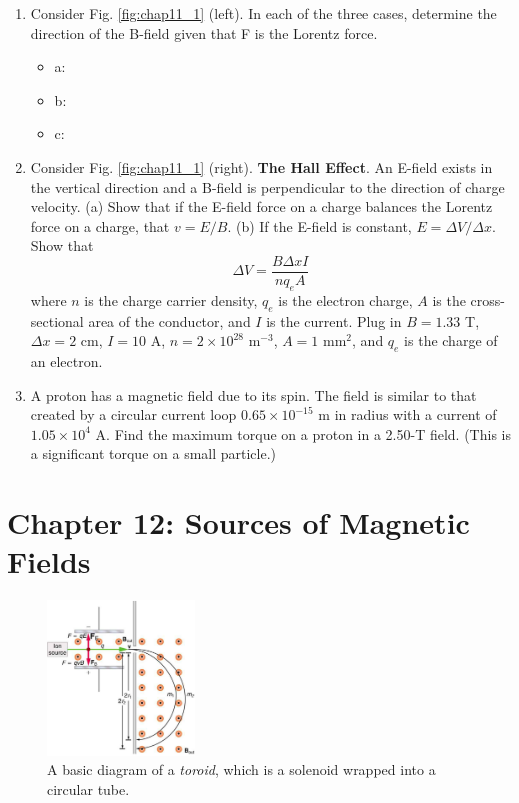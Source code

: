 \documentclass[10pt]{article}
\begin{document}
\begin{enumerate}
\item Consider Fig. \ref{fig:chap11_1} (left).  In each of the three cases, determine the direction of the B-field given that F is the Lorentz force.
\begin{itemize}
\item a:
\item b:
\item c:
\end{itemize}
\item Consider Fig. \ref{fig:chap11_1} (right).  \textbf{The Hall Effect}.  An E-field exists in the vertical direction and a B-field is perpendicular to the direction of charge velocity.  (a) Show that if the E-field force on a charge balances the Lorentz force on a charge, that $v = E/B$. (b) If the E-field is constant, $E = \Delta V/\Delta x$.  Show that
\begin{equation}
\Delta V = \frac{B\Delta x I}{n q_e A}
\end{equation}
where $n$ is the charge carrier density, $q_e$ is the electron charge, $A$ is the cross-sectional area of the conductor, and $I$ is the current.  Plug in $B = 1.33$ T, $\Delta x = 2$ cm, $I = 10$ A, $n = 2 \times 10^{28}$ m$^{-3}$, $A = 1$ mm$^2$, and $q_e$ is the charge of an electron. \\ \vspace{2.5cm}
\item A proton has a magnetic field due to its spin. The field is similar to that created by a circular current loop $0.65 \times 10^{-15}$ m in radius with a current of $1.05 \times 10^{4}$ A.  Find the maximum torque on a proton in a 2.50-T field. (This is a significant torque on a small particle.) \\ \vspace{1cm}
\end{enumerate}

\section{Chapter 12: Sources of Magnetic Fields}

\begin{figure}[ht]
\centering
\includegraphics[width=0.35\textwidth]{vsel.jpeg}
\caption{\label{fig:chap12_1} A basic diagram of a \textit{toroid}, which is a solenoid wrapped into a circular tube.}
\end{figure}
\end{document}
